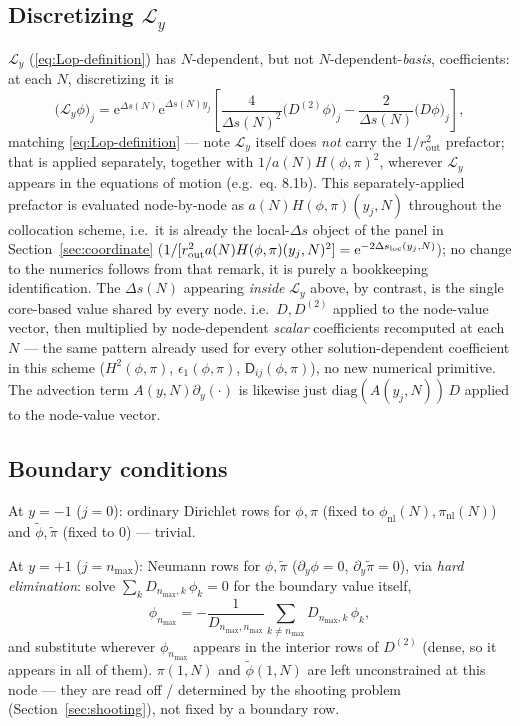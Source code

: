 \documentclass[a4paper,11pt]{article}
\newcommand{\e}[1]{\mathrm{e}^{{#1}}}
\newcommand{\Ny}{N}                          %
\newcommand{\epsSR}{\epsilon_1}              %
\newcommand{\Hub}{H}                         %
\newcommand{\sfactor}{a}                     %
\newcommand{\atloc}{(\field,\mom)}           %
\newcommand{\field}{\phi}                    %
\newcommand{\mom}{\pi}                       %
\newcommand{\phinl}{\field_{\mathrm{nl}}}    %
\newcommand{\pinl}{\mom_{\mathrm{nl}}}       %
\newcommand{\rfield}{\widetilde\field}       %
\newcommand{\rmom}{\widetilde\mom}           %
\newcommand{\rad}{r}                         %
\newcommand{\yco}{y}                         %
\newcommand{\rout}{\rad_{\mathrm{out}}}      %
\newcommand{\aHloc}{\sfactor(\Ny)\Hub\atloc} %
\newcommand{\Deltas}{\Delta s}                %
\newcommand{\advcoef}{A}                     %
\newcommand{\Lop}{\mathcal{L}_\yco}          %
\newcommand{\modeidx}{n}                     %
\newcommand{\Dcm}[1]{\mathsf{D}_{#1}}        %
\begin{document}
\subsection{Discretizing $\Lop$}

$\Lop$ (\eqref{eq:Lop-definition}) has $\Ny$-dependent, but not
$\Ny$-dependent-\emph{basis}, coefficients: at each $\Ny$, discretizing it
is
\begin{equation}
    \big(\Lop\field\big)_j
    =
    \e{\Deltas(\Ny)}\e{\Deltas(\Ny)\yco_j}
    \left[\frac{4}{\Deltas(\Ny)^2}\big(D^{(2)}\field\big)_j - \frac{2}{\Deltas(\Ny)}\big(D\field\big)_j\right] ,
\end{equation}
matching \eqref{eq:Lop-definition} --- note $\Lop$ itself does \emph{not}
carry the $1/\rout^2$ prefactor; that is applied separately, together with
$1/\aHloc^2$, wherever $\Lop$ appears in the equations of motion (e.g.\
eq. 8.1b). This separately-applied prefactor is evaluated node-by-node as
$\aHloc(\yco_j,\Ny)$ throughout the collocation scheme, i.e.\ it is already
the local-$\Deltas$ object of the panel in Section~\ref{sec:coordinate}
($1/[\rout^2\aHloc(\yco_j,\Ny)^2]=\e{-2\Deltas_{\rm loc}(\yco_j,\Ny)}$); no
change to the numerics follows from that remark, it is purely a
bookkeeping identification. The $\Deltas(\Ny)$ appearing \emph{inside}
$\Lop$ above, by contrast, is the single core-based value shared by every
node.
i.e.\ $D,D^{(2)}$ applied to the node-value vector, then multiplied by
node-dependent \emph{scalar} coefficients recomputed at each $\Ny$ --- the
same pattern already used for every other solution-dependent coefficient
in this scheme ($\Hub^2\atloc$, $\epsSR\atloc$, $\Dcm{ij}\atloc$), no new
numerical primitive. The advection term $\advcoef(\yco,\Ny)\partial_\yco(\cdot)$
is likewise just $\mathrm{diag}(\advcoef(\yco_j,\Ny))\,D$ applied to the
node-value vector.

\subsection{Boundary conditions}

At $\yco=-1$ ($j=0$): ordinary Dirichlet rows for $\field,\mom$ (fixed to
$\phinl(\Ny),\pinl(\Ny)$) and $\rfield,\rmom$ (fixed to $0$) --- trivial.

At $\yco=+1$ ($j=\modeidx_{\max}$): Neumann rows for $\field,\rmom$
($\partial_\yco\field=0$, $\partial_\yco\rmom=0$), via \emph{hard
elimination}: solve $\sum_k D_{\modeidx_{\max},k}\,\field_k=0$ for the
boundary value itself,
\begin{equation}
    \field_{\modeidx_{\max}} = -\frac{1}{D_{\modeidx_{\max},\modeidx_{\max}}}\sum_{k\neq\modeidx_{\max}} D_{\modeidx_{\max},k}\,\field_k ,
\end{equation}
and substitute wherever $\field_{\modeidx_{\max}}$ appears in the interior
rows of $D^{(2)}$ (dense, so it appears in all of them). $\mom(1,\Ny)$ and
$\rfield(1,\Ny)$ are left unconstrained at this node --- they are read off
/ determined by the shooting problem (Section~\ref{sec:shooting}), not
fixed by a boundary row.
\end{document}
